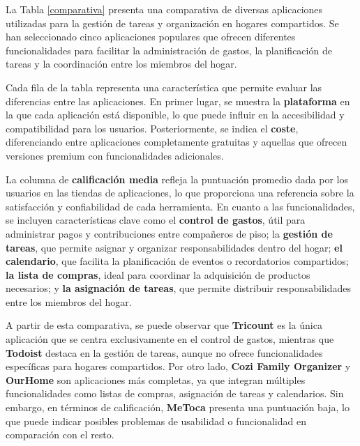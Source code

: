 La Tabla \ref{comparativa} presenta una comparativa de diversas aplicaciones utilizadas para la gestión de tareas y organización en hogares compartidos. 
Se han seleccionado cinco aplicaciones populares que ofrecen diferentes funcionalidades para facilitar la administración de gastos, 
la planificación de tareas y la coordinación entre los miembros del hogar.

Cada fila de la tabla representa una característica que permite evaluar las diferencias entre las aplicaciones. 
En primer lugar, se muestra la \textbf{plataforma} en la que cada aplicación está disponible, lo que puede influir en la accesibilidad y compatibilidad para los usuarios. 
Posteriormente, se indica el \textbf{coste}, diferenciando entre aplicaciones completamente gratuitas y aquellas que ofrecen versiones premium con funcionalidades adicionales.

La columna de \textbf{calificación media} refleja la puntuación promedio dada por los usuarios en las tiendas de aplicaciones, lo que proporciona una referencia sobre la satisfacción y confiabilidad de cada herramienta. 
En cuanto a las funcionalidades, se incluyen características clave como el \textbf{control de gastos}, útil para administrar pagos y contribuciones entre compañeros de piso; la \textbf{gestión de tareas}, que permite asignar y organizar responsabilidades dentro del hogar; \textbf{el calendario}, que facilita la planificación de eventos o recordatorios compartidos; \textbf{la lista de compras}, ideal para coordinar la adquisición de productos necesarios; y \textbf{la asignación de tareas}, que permite distribuir responsabilidades entre los miembros del hogar.

A partir de esta comparativa, se puede observar que \textbf{Tricount} es la única aplicación que se centra exclusivamente en el control de gastos, mientras que \textbf{Todoist} destaca en la gestión de tareas, aunque no ofrece funcionalidades específicas para hogares compartidos. Por otro lado, \textbf{Cozi Family Organizer} y \textbf{OurHome} son aplicaciones más completas, ya que integran múltiples funcionalidades como listas de compras, asignación de tareas y calendarios. 
Sin embargo, en términos de calificación, \textbf{MeToca} presenta una puntuación baja, lo que puede indicar posibles problemas de usabilidad o funcionalidad en comparación con el resto.





\newpage



